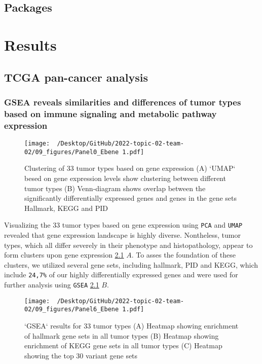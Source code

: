 \documentclass[
  parskip,
  oneside]{scrreprt}
\begin{document}
\hypertarget{packages}{%
\section{Packages}\label{packages}}

\hypertarget{results}{%
\chapter{Results}\label{results}}

\hypertarget{tcga-pan-cancer-analysis-1}{%
\section{TCGA pan-cancer analysis}\label{tcga-pan-cancer-analysis-1}}

\hypertarget{gsea-reveals-similarities-and-differences-of-tumor-types-based-on-immune-signaling-and-metabolic-pathway-expression}{%
\subsection{GSEA reveals similarities and differences of tumor types
based on immune signaling and metabolic pathway
expression}\label{gsea-reveals-similarities-and-differences-of-tumor-types-based-on-immune-signaling-and-metabolic-pathway-expression}}

\begin{figure}[h]
  \texttt{[image: ~/Desktop/GitHub/2022-topic-02-team-02/09\_figures/Panel0\_Ebene 1.pdf]}
  \caption{Clustering of 33 tumor types based on gene expression (A) `UMAP` besed on gene expression levels show clustering between different tumor types (B) Venn-diagram shows overlap between the significantly differentially expressed genes and genes in the gene sets Hallmark, KEGG and PID}
  \label{`UMAP`}
\end{figure}

Visualizing the 33 tumor types based on gene expression using
\texttt{PCA} and \texttt{UMAP} revealed that gene expression landscape
is highly diverse. Nontheless, tumor types, which all differ severely in
their phenotype and histopathology, appear to form clusters upon gene
expression \cref{`UMAP`} \(A\). To asses the foundation of these
clusters, we utilized several gene sets, including hallmark, PID and
KEGG, which include \texttt{24,7\%} of our highly differentially
expressed genes and were used for further analysis using \texttt{GSEA}
\cref{`UMAP`} \(B\).

\begin{figure}[h]
  \texttt{[image: ~/Desktop/GitHub/2022-topic-02-team-02/09\_figures/Panel6\_Ebene 1.pdf]}
  \caption{`GSEA` results for 33 tumor types (A) Heatmap showing enrichment of hallmark gene sets in all tumor types (B) Heatmap showing enrichment of KEGG gene sets in all tumor types (C) Heatmap showing the top 30 variant gene sets}
  \label{hm}
\end{figure}
\end{document}
